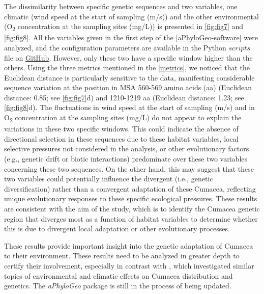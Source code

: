 The dissimilarity between specific genetic sequences and two variables, one climatic (wind speed at the start of sampling (m/s)) and the other environmental (O\textsubscript{2} concentration at the sampling sites (mg/L)) is presented in \autoref{fig:fig7} and \autoref{fig:fig8}. All the variables given in the first step of the \autoref{aPhyloGeo-software} were analyzed, and the configuration parameters are available in the Python $scripts$ file on \href{https://github.com/tahiri-lab/Cumacea_aPhyloGeo}{GitHub}. However, only these two have a specific window higher than the others. Using the three metrics mentioned in the \autoref{metrics}, we noticed that the Euclidean distance is particularly sensitive to the data, manifesting considerable sequence variation at the position in MSA 560-569 amino acids (aa) (Euclidean distance: 0.85; see \autoref{fig:fig7}d) and 1210-1219 aa (Euclidean distance: 1.23; see \autoref{fig:fig8}d). The fluctuations in wind speed at the start of sampling (m/s) and in O\textsubscript{2} concentration at the sampling sites (mg/L) do not appear to explain the variations in these two specific windows. This could indicate the absence of directional selection in these sequences due to these habitat variables, local selective pressures not considered in the analysis, or other evolutionary factors (e.g., genetic drift or biotic interactions) predominate over these two variables concerning these two sequences. On the other hand, this may suggest that these two variables could potentially influence the divergent (i.e., genetic diversification) rather than a convergent adaptation of these Cumacea, reflecting unique evolutionary responses to these specific ecological pressures. These results are consistent with the aim of the study, which is to identify the Cumacea genetic region that diverges most as a function of habitat variables to determine whether this is due to divergent local adaptation or other evolutionary processes.

These results provide important insight into the genetic adaptation of Cumacea to their environment. These results need to be analyzed in greater depth to certify their involvement, especially in contrast with \citep{uhlir_adding_2021}, which investigated similar topics of environmental and climatic effects on Cumacea distribution and genetics. The \textit{aPhyloGeo} package is still in the process of being updated.

